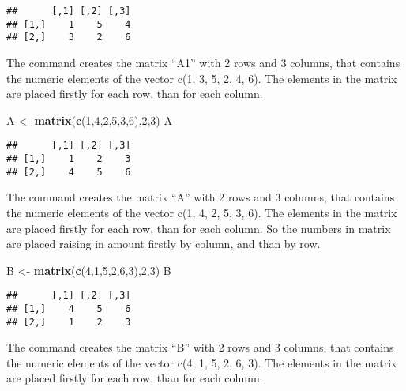 \documentclass[12pt,]{article}
\newenvironment{Shaded}{\begin{snugshade}}{\end{snugshade}}
\newcommand{\KeywordTok}[1]{\textcolor[rgb]{0.13,0.29,0.53}{\textbf{#1}}}
\newcommand{\DecValTok}[1]{\textcolor[rgb]{0.00,0.00,0.81}{#1}}
\newcommand{\StringTok}[1]{\textcolor[rgb]{0.31,0.60,0.02}{#1}}
\newcommand{\NormalTok}[1]{#1}
\begin{document}
\begin{verbatim}
##      [,1] [,2] [,3]
## [1,]    1    5    4
## [2,]    3    2    6
\end{verbatim}

The command creates the matrix ``A1'' with 2 rows and 3 columns, that
contains the numeric elements of the vector c(1, 3, 5, 2, 4, 6). The
elements in the matrix are placed firstly for each row, than for each
column.

\begin{Shaded}
\begin{Highlighting}[]
\NormalTok{A <-}\StringTok{ }\KeywordTok{matrix}\NormalTok{(}\KeywordTok{c}\NormalTok{(}\DecValTok{1}\NormalTok{,}\DecValTok{4}\NormalTok{,}\DecValTok{2}\NormalTok{,}\DecValTok{5}\NormalTok{,}\DecValTok{3}\NormalTok{,}\DecValTok{6}\NormalTok{),}\DecValTok{2}\NormalTok{,}\DecValTok{3}\NormalTok{)}
\NormalTok{A}
\end{Highlighting}
\end{Shaded}

\begin{verbatim}
##      [,1] [,2] [,3]
## [1,]    1    2    3
## [2,]    4    5    6
\end{verbatim}

The command creates the matrix ``A'' with 2 rows and 3 columns, that
contains the numeric elements of the vector c(1, 4, 2, 5, 3, 6). The
elements in the matrix are placed firstly for each row, than for each
column. So the numbers in matrix are placed raising in amount firstly by
column, and than by row.

\begin{Shaded}
\begin{Highlighting}[]
\NormalTok{B <-}\StringTok{ }\KeywordTok{matrix}\NormalTok{(}\KeywordTok{c}\NormalTok{(}\DecValTok{4}\NormalTok{,}\DecValTok{1}\NormalTok{,}\DecValTok{5}\NormalTok{,}\DecValTok{2}\NormalTok{,}\DecValTok{6}\NormalTok{,}\DecValTok{3}\NormalTok{),}\DecValTok{2}\NormalTok{,}\DecValTok{3}\NormalTok{)}
\NormalTok{B}
\end{Highlighting}
\end{Shaded}

\begin{verbatim}
##      [,1] [,2] [,3]
## [1,]    4    5    6
## [2,]    1    2    3
\end{verbatim}

The command creates the matrix ``B'' with 2 rows and 3 columns, that
contains the numeric elements of the vector c(4, 1, 5, 2, 6, 3). The
elements in the matrix are placed firstly for each row, than for each
column.
\end{document}
